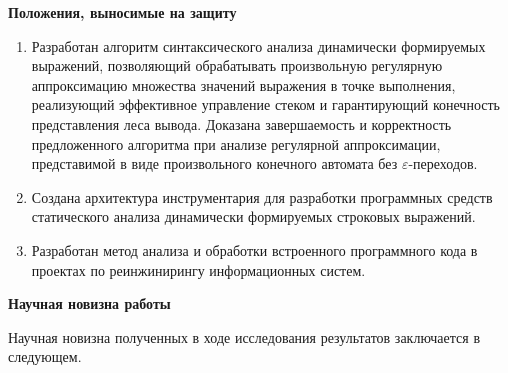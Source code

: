 \textbf{Положения, выносимые на защиту}
\begin{enumerate}
    \item Разработан алгоритм синтаксического анализа динамически формируемых выражений, позволяющий обрабатывать произвольную регулярную аппроксимацию множества значений выражения в точке выполнения, реализующий 
    эффективное управление стеком и гарантирующий конечность представления леса вывода. Доказана завершаемость и корректность предложенного алгоритма при анализе регулярной аппроксимации, представимой в виде произвольного конечного автомата без $\varepsilon$-переходов. 
    \item Создана архитектура инструментария для разработки программных средств статического анализа динамически формируемых строковых выражений.
    \item Разработан метод анализа и обработки встроенного программного кода в проектах по реинжинирингу информационных систем. 
\end{enumerate}



\textbf{Научная новизна работы}

Научная новизна полученных в ходе исследования результатов заключается в следующем.

